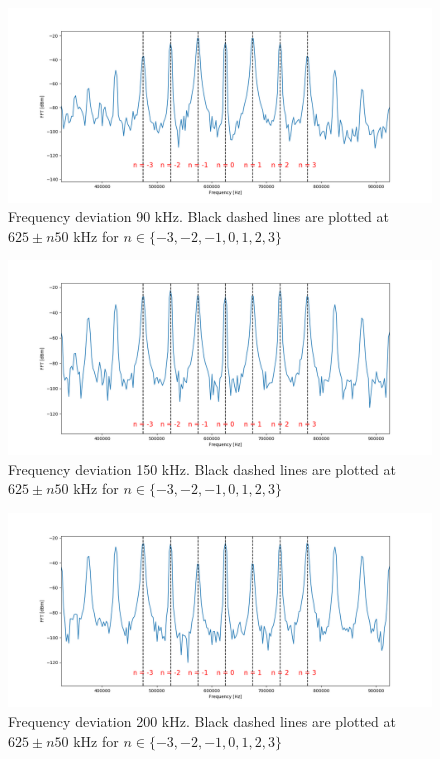 \documentclass[a4paper,10pt]{article}
\begin{document}
\begin{figure}[H]
\centering
\includegraphics[width=\textwidth]{freqdev90}
\caption{Frequency deviation 90 kHz. Black dashed lines are plotted at $625\pm n50$ kHz for $n\in\{-3,-2,-1,0,1,2,3\}$}\label{freqdev90}
\end{figure}
\begin{figure}[H]
\centering
\includegraphics[width=\textwidth]{freqdev150}
\caption{Frequency deviation 150 kHz. Black dashed lines are plotted at $625\pm n50$ kHz for $n\in\{-3,-2,-1,0,1,2,3\}$}\label{freqdev150}
\end{figure}
\begin{figure}[H]
\centering
\includegraphics[width=\textwidth]{freqdev200}
\caption{Frequency deviation 200 kHz. Black dashed lines are plotted at $625\pm n50$ kHz for $n\in\{-3,-2,-1,0,1,2,3\}$}\label{freqdev200}
\end{figure}
\end{document}
